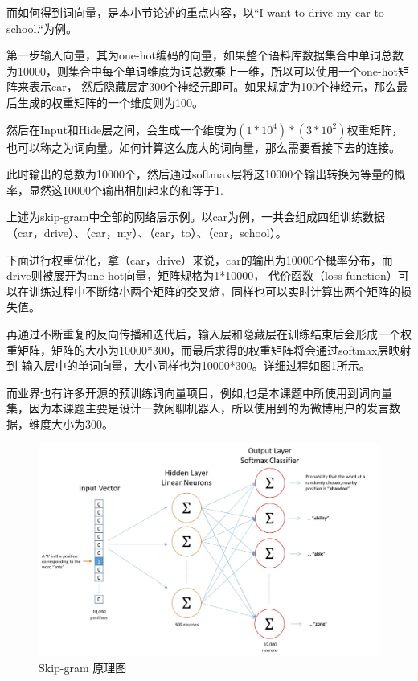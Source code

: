\documentclass[supercite]{HustGraduPaper}
\theoremstyle{definition}
\begin{document}
而如何得到词向量，是本小节论述的重点内容，以“I want to drive my car to school.“为例。

第一步输入向量，其为one-hot编码的向量，如果整个语料库数据集合中单词总数为10000，则集合中每个单词维度为词总数乘上一维，所以可以使用一个one-hot矩阵来表示car，
然后隐藏层定300个神经元即可。如果规定为100个神经元，那么最后生成的权重矩阵的一个维度则为100。

然后在Input和Hide层之间，会生成一个维度为$(1*10^4)*(3*10^2)$权重矩阵，也可以称之为词向量。如何计算这么庞大的词向量，那么需要看接下去的连接。

此时输出的总数为10000个，然后通过softmax层将这10000个输出转换为等量的概率，显然这10000个输出相加起来的和等于1.

上述为skip-gram中全部的网络层示例。以car为例，一共会组成四组训练数据（car，drive）、（car，my）、（car，to）、（car，school）。

下面进行权重优化，拿（car，drive）来说，car的输出为10000个概率分布，而drive则被展开为one-hot向量，矩阵规格为1*10000，
代价函数（loss function）可以在训练过程中不断缩小两个矩阵的交叉熵，同样也可以实时计算出两个矩阵的损失值。

再通过不断重复的反向传播和迭代后，输入层和隐藏层在训练结束后会形成一个权重矩阵，矩阵的大小为10000*300，而最后求得的权重矩阵将会通过softmax层映射到
输入层中的单词向量，大小同样也为10000*300。详细过程如图\ref{Fig.skipgram}所示。

而业界也有许多开源的预训练词向量项目，例如\cite{wordvector},也是本课题中所使用到词向量集，因为本课题主要是设计一款闲聊机器人，所以使用到的为微博用户的发言数据，维度大小为300。

\begin{figure}[htbp] %
  \centering %
  \includegraphics[width=1\textwidth]{images/skip-gram.png} %
  \caption{Skip-gram 原理图} %
  \label{Fig.skipgram} %
\end{figure}
\end{document}
